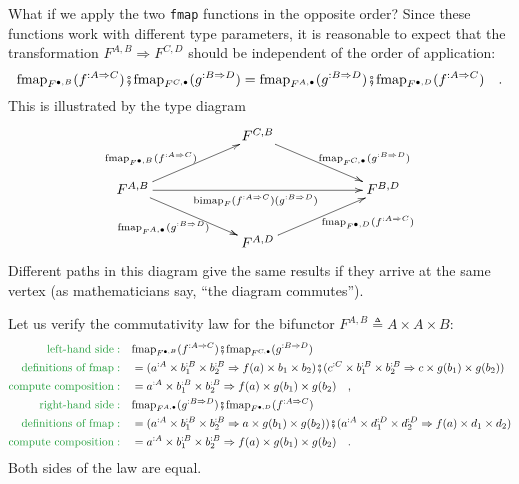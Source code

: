 What if we apply the two \lstinline!fmap! functions in the opposite
order? Since these functions work with different type parameters,
it is reasonable to expect that the transformation $F^{A,B}\Rightarrow F^{C,D}$
should be independent of the order of application:
\begin{equation}
\text{fmap}_{F^{\bullet,B}}(f^{:A\Rightarrow C})\bef\text{fmap}_{F^{C,\bullet}}(g^{:B\Rightarrow D})=\text{fmap}_{F^{A,\bullet}}(g^{:B\Rightarrow D})\bef\text{fmap}_{F^{\bullet,D}}(f^{:A\Rightarrow C})\quad.\label{eq:f-fmap-fmap-bifunctor-commutativity}
\end{equation}
This is illustrated by the type diagram 
\[
\xymatrix{\xyScaleY{2.0pc}\xyScaleX{5.0pc} & F^{C,B}\ar[rd]\sp(0.6){\ ~~\text{fmap}_{F^{C,\bullet}}(g^{:B\Rightarrow D})}\\
F^{A,B}\ar[ru]\sp(0.4){\text{fmap}_{F^{\bullet,B}}(f^{:A\Rightarrow C})~~~}\ar[rd]\sb(0.5){\text{fmap}_{F^{A,\bullet}}(g^{:B\Rightarrow D})~~\ }\ar[rr]\sb(0.5){\text{bimap}_{F}(f^{:A\Rightarrow C})(g^{:B\Rightarrow D})\ } &  & F^{B,D}\\
 & F^{A,D}\ar[ru]\sb(0.6){~~~~\text{fmap}_{F^{\bullet,D}}(f^{:A\Rightarrow C})}
}
\]
Different paths in this diagram give the same results if they arrive
at the same vertex (as mathematicians say, ``the diagram commutes'').

Let us verify the commutativity law for the bifunctor $F^{A,B}\triangleq A\times A\times B$:
\begin{align*}
{\color{greenunder}\text{left-hand side}:}\quad & \text{fmap}_{F^{\bullet,B}}(f^{:A\Rightarrow C})\bef\text{fmap}_{F^{C,\bullet}}(g^{:B\Rightarrow D})\\
{\color{greenunder}\text{definitions of }\text{fmap}:}\quad & =(a^{:A}\times b_{1}^{:B}\times b_{2}^{:B}\Rightarrow f(a)\times b_{1}\times b_{2})\bef(c^{:C}\times b_{1}^{:B}\times b_{2}^{:B}\Rightarrow c\times g(b_{1})\times g(b_{2}))\\
{\color{greenunder}\text{compute composition}:}\quad & =a^{:A}\times b_{1}^{:B}\times b_{2}^{:B}\Rightarrow f(a)\times g(b_{1})\times g(b_{2})\quad,\\
{\color{greenunder}\text{right-hand side}:}\quad & \text{fmap}_{F^{A,\bullet}}(g^{:B\Rightarrow D})\bef\text{fmap}_{F^{\bullet,D}}(f^{:A\Rightarrow C})\\
{\color{greenunder}\text{definitions of }\text{fmap}:}\quad & =(a^{:A}\times b_{1}^{:B}\times b_{2}^{:B}\Rightarrow a\times g(b_{1})\times g(b_{2}))\bef(a^{:A}\times d_{1}^{:D}\times d_{2}^{:D}\Rightarrow f(a)\times d_{1}\times d_{2})\\
{\color{greenunder}\text{compute composition}:}\quad & =a^{:A}\times b_{1}^{:B}\times b_{2}^{:B}\Rightarrow f(a)\times g(b_{1})\times g(b_{2})\quad.
\end{align*}
Both sides of the law are equal.

